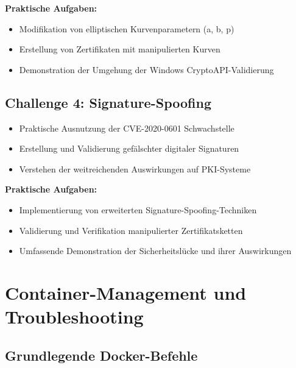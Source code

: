 \documentclass{article}
\begin{document}
\textbf{Praktische Aufgaben:}
\begin{itemize}[leftmargin=1.5cm]
    \item Modifikation von elliptischen Kurvenparametern (a, b, p)
    \item Erstellung von Zertifikaten mit manipulierten Kurven
    \item Demonstration der Umgehung der Windows CryptoAPI-Validierung
\end{itemize}

\vspace{0.8cm}

\subsection{Challenge 4: Signature-Spoofing}

\begin{tcolorbox}[colback=red!10,colframe=red,title=\textbf{Lernziele}]
\begin{itemize}[leftmargin=1cm]
    \item Praktische Ausnutzung der CVE-2020-0601 Schwachstelle
    \item Erstellung und Validierung gefälschter digitaler Signaturen
    \item Verstehen der weitreichenden Auswirkungen auf PKI-Systeme
\end{itemize}
\end{tcolorbox}

\textbf{Praktische Aufgaben:}
\begin{itemize}[leftmargin=1.5cm]
    \item Implementierung von erweiterten Signature-Spoofing-Techniken
    \item Validierung und Verifikation manipulierter Zertifikatsketten
    \item Umfassende Demonstration der Sicherheitslücke und ihrer Auswirkungen
\end{itemize}

\clearpage

\section{Container-Management und Troubleshooting}

\subsection{Grundlegende Docker-Befehle}
\end{document}
